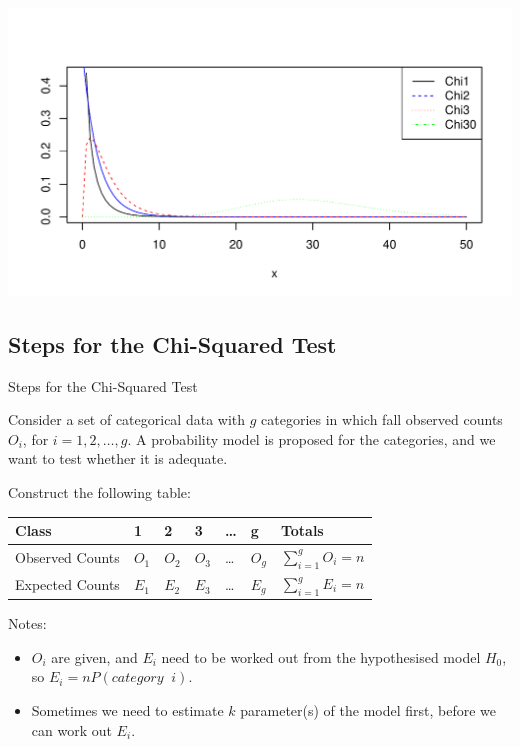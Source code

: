 \documentclass[t,xcolor=pdftex,dvipsnames,table]{beamer}
\makeatletter
\def\maxwidth{ %
  \ifdim\Gin@nat@width>\linewidth
    \linewidth
  \else
    \Gin@nat@width
  \fi
}
\newenvironment{knitrout}{}{} %
\makeatother
\begin{document}
\begin{frame}[fragile]\frametitle{}
\begin{knitrout}
\color{fgcolor}
\includegraphics[width=\maxwidth]{figure/unnamed-chunk-5-1} 

\end{knitrout}
\end{frame}


\subsection[GoodnessofFit]{Steps for the Chi-Squared Test}
\begin{frame}[fragile]{Steps for the Chi-Squared Test}

Consider a set of categorical data with $g$ categories in which fall observed counts $O_{i}$, for $i=1,2,\ldots,g$. A probability model is proposed for the categories, and we want to test whether it is adequate.

\vspace{.5cm}
Construct the following table:

\begin{center}
\begin{tabular}{|l|lllll|l|} \hline
Class & 1 & 2 & 3 & \ldots & g & Totals \\ \hline
Observed Counts & $O_{1}$ & $O_{2}$ & $O_{3}$ & \ldots & $O_{g}$ & $\sum_{i=1}^{g} O_{i} = n$ \\
Expected Counts & $E_{1}$ & $E_{2}$ & $E_{3}$ & \ldots & $E_{g}$ & $\sum_{i=1}^{g} E_{i} = n$ \\ \hline
\end{tabular}
\end{center}

\vspace{.5cm}
Notes:
\begin{itemize}
\item $O_{i}$ are given, and $E_{i}$ need to be worked out from the hypothesised model $H_{0}$, so   $E_{i} = n P(category \;\; i)$.
\item Sometimes we need to estimate $k$ parameter(s) of the model first, before we can work out $E_{i}$.
\end{itemize}
\end{frame} 
\end{document}
